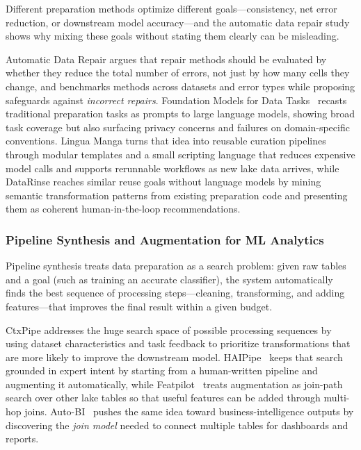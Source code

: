 \documentclass[sigconf]{acmart}
\begin{document}
Different preparation methods optimize different goals---consistency, net error reduction, or downstream model accuracy---and the automatic data repair study~\cite{10.14778/3675034.3675051} shows why mixing these goals without stating them clearly can be misleading.

Automatic Data Repair argues that repair methods should be evaluated by whether they reduce the total number of errors, not just by how many cells they change, and benchmarks methods across datasets and error types while proposing safeguards against \emph{incorrect repairs}. Foundation Models for Data Tasks~\cite{10.14778/3574245.3574258} recasts traditional preparation tasks as prompts to large language models, showing broad task coverage but also surfacing privacy concerns and failures on domain-specific conventions. Lingua Manga turns that idea into reusable curation pipelines through modular templates and a small scripting language that reduces expensive model calls and supports rerunnable workflows as new lake data arrives, while DataRinse reaches similar reuse goals without language models by mining semantic transformation patterns from existing preparation code and presenting them as coherent human-in-the-loop recommendations.



\subsubsection{Pipeline Synthesis and Augmentation for ML Analytics}
Pipeline synthesis treats data preparation as a search problem: given raw tables and a goal (such as training an accurate classifier), the system automatically finds the best sequence of processing steps---cleaning, transforming, and adding features---that improves the final result within a given budget.

CtxPipe addresses the huge search space of possible processing sequences by using dataset characteristics and task feedback to prioritize transformations that are more likely to improve the downstream model. HAIPipe~\cite{10.1145/3588945} keeps that search grounded in expert intent by starting from a human-written pipeline and augmenting it automatically, while Featpilot~\cite{11113027} treats augmentation as join-path search over other lake tables so that useful features can be added through multi-hop joins. Auto-BI~\cite{10.14778/3603581.3603596} pushes the same idea toward business-intelligence outputs by discovering the \emph{join model} needed to connect multiple tables for dashboards and reports.
\end{document}
